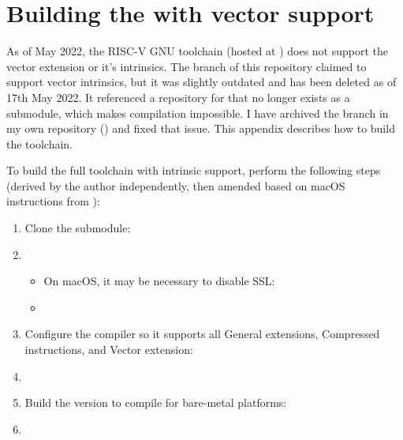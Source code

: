 \chapter{Building the  with vector support}\label{appx:building_rvv_gcc_toolchain}

As of May 2022, the RISC-V GNU toolchain (hosted at ) does not support the vector extension or it's intrinsics.
The  branch of this repository claimed to support vector intrinsics, but it was slightly outdated and has been deleted as of 17th May 2022.
It referenced a repository for  that no longer exists as a submodule, which makes compilation impossible.
I have archived the branch in my own repository () and fixed that issue.
This appendix describes how to build the toolchain.

To build the full toolchain with intrinsic support, perform the following steps (derived by the author independently, then amended based on macOS instructions from ):
\begin{enumerate}
    \item Clone the  submodule:
    \item[\code{\$}] 
    \begin{itemize}
        \item On macOS, it may be necessary to disable SSL:
        \item[\code{\$}] 
    \end{itemize}
    \item Configure the compiler so it supports all General extensions, Compressed instructions, and Vector extension:
    \item[\code{\$}] 
    \item Build the  version to compile for bare-metal platforms:
    \item[\code{\$}] 
\end{enumerate}
